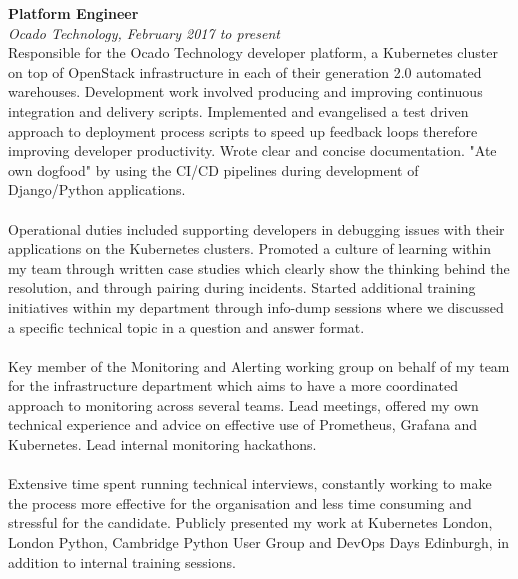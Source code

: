 \documentclass{article}
\begin{document}
\begin{flushleft}
\textbf{Platform Engineer}\\
\textit{Ocado Technology, February 2017 to present}\\[5pt]
Responsible for the Ocado Technology developer platform, a Kubernetes cluster on top of OpenStack infrastructure in each of their generation 2.0 automated warehouses. Development work involved producing and improving continuous integration and delivery scripts. Implemented and evangelised a test driven approach to deployment process scripts to speed up feedback loops therefore improving developer productivity. Wrote clear and concise documentation. "Ate own dogfood" by using the CI/CD pipelines during development of Django/Python applications.

\paragraph{}Operational duties included supporting developers in debugging issues with their applications on the Kubernetes clusters. Promoted a culture of learning within my team through written case studies which clearly show the thinking behind the resolution, and through pairing during incidents. Started additional training initiatives within my department through info-dump sessions where we discussed a specific technical topic in a question and answer format.

\paragraph{}Key member of the Monitoring and Alerting working group on behalf of my team for the infrastructure department which aims to have a more coordinated approach to monitoring across several teams. Lead meetings, offered my own technical experience and advice on effective use of Prometheus, Grafana and Kubernetes. Lead internal monitoring hackathons.

\paragraph{}Extensive time spent running technical interviews, constantly working to make the process more effective for the organisation and less time consuming and stressful for the candidate. Publicly presented my work at Kubernetes London, London Python, Cambridge Python User Group and DevOps Days Edinburgh, in addition to internal training sessions.\\[10pt]


\end{flushleft}
\end{document}
